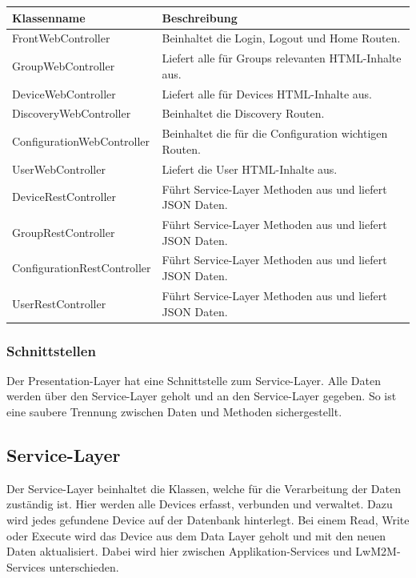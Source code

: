 \begin{table}[H]
\centering
    \begin{tabular}{@{}l p{11.9cm} @{}}\toprule    
    {Klassenname} & {Beschreibung}\\ \midrule
     FrontWebController & Beinhaltet die Login, Logout und Home Routen.  \\       
     GroupWebController & Liefert alle für Groups relevanten HTML-Inhalte aus. \\       
     DeviceWebController & Liefert alle für Devices HTML-Inhalte aus.  \\       
     DiscoveryWebController & Beinhaltet die Discovery Routen.  \\       
     ConfigurationWebController & Beinhaltet die für die Configuration wichtigen Routen.  \\       
     UserWebController & Liefert die User HTML-Inhalte aus. \\       
     DeviceRestController & Führt Service-Layer Methoden aus und liefert JSON Daten.  \\       
     GroupRestController & Führt Service-Layer Methoden aus und liefert JSON Daten.  \\       
     ConfigurationRestController & Führt Service-Layer Methoden aus und liefert JSON Daten. \\       
     UserRestController & Führt Service-Layer Methoden aus und liefert JSON Daten.  \\         
    \bottomrule
    \end{tabular}
\end{table}

\subsubsection{Schnittstellen}
Der Presentation-Layer hat eine Schnittstelle zum Service-Layer. Alle Daten werden über den Service-Layer geholt und an den Service-Layer gegeben. So ist eine saubere Trennung zwischen Daten und Methoden sichergestellt. 

\newpage

\subsection{Service-Layer}
Der Service-Layer beinhaltet die Klassen, welche für die Verarbeitung der Daten zuständig ist. Hier werden alle Devices erfasst, verbunden und verwaltet. Dazu wird jedes gefundene Device auf der Datenbank hinterlegt. Bei einem Read, Write oder Execute wird das Device aus dem Data Layer geholt und mit den neuen Daten aktualisiert. Dabei wird hier zwischen Applikation-Services und LwM2M-Services unterschieden.

